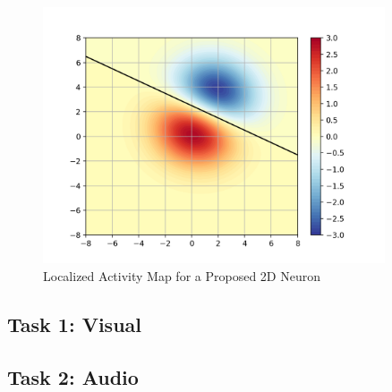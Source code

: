 \documentclass[12pt,oneside]{CUNY_PhD}
\begin{document}
\begin{figure}[!htb]
\centering
\includegraphics[width=0.9\textwidth]{images/2d_localized_activity_map.png}
\caption{Localized Activity Map for a Proposed 2D Neuron}
\label{fig:locmap}
\end{figure}

\subsection{Task 1: Visual}
\subsection{Task 2: Audio}




\backmatter



\end{document}

